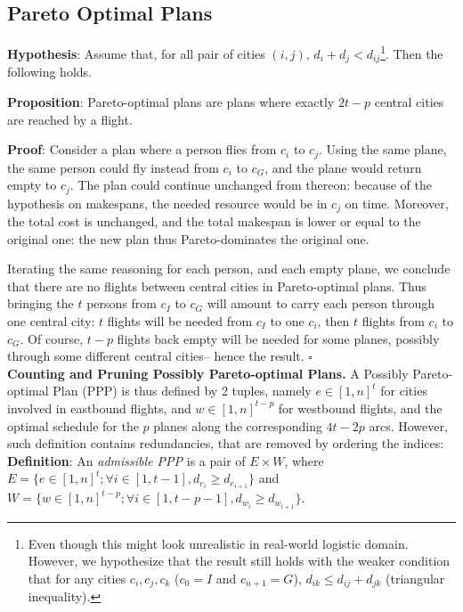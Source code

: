 \documentclass{llncs}
\begin{document}
\subsection{Pareto Optimal Plans}

\noindent
{\bf Hypothesis}: Assume that, for all pair of cities $(i,j)$, $d_i + d_j < d_{ij}$\footnote{Even though this might look unrealistic in real-world logistic domain. However, we hypothesize that the result still holds with the weaker condition that for any cities $c_i, c_j, c_k$ ($c_0=I$ and $c_{n+1}=G$), $d_{ik} \leq d_{ij} + d_{jk}$ (triangular inequality).}. Then the following holds.

\noindent
{\bf Proposition}: Pareto-optimal plans are plans where exactly $2t-p$ central cities are reached by a flight.

\noindent
{\bf Proof}:
Consider a plan where a person flies from $c_i$ to $c_j$. Using the same plane, the same person could fly instead from $c_i$ to $c_G$, and the plane would return empty to $c_j$. The plan could continue unchanged from thereon: because of the hypothesis on makespans, the needed resource would be in $c_j$ on time. Moreover, the total cost is unchanged, and the total makespan is lower or equal to the original one: the new plan thus Pareto-dominates the original one.

Iterating the same reasoning for each person, and each empty plane, we conclude that there are no flights between central cities in Pareto-optimal plans. Thus bringing the $t$ persons from $c_I$ to $c_G$ will amount to carry each person through one central city: $t$ flights will be needed from $c_I$ to one $c_i$, then $t$ flights from $c_i$ to $c_G$. Of course, $t-p$ flights back empty will be needed for some planes, possibly through some different central cities-- hence the result. \hfill $\square$\\

\noindent
{\bf Counting and Pruning Possibly Pareto-optimal Plans.}
A Possibly Pareto-optimal Plan (PPP) is thus defined by 2 tuples, namely $e \in [1,n]^t$ for cities involved in eastbound flights, and $w \in [1,n]^{t-p}$ for westbound flights, and the optimal  schedule for the $p$ planes along the corresponding $4t-2p$ arcs. However, such definition contains redundancies, that are removed by ordering the indices:\\

\noindent
{\bf Definition}: An {\it admissible PPP} is a pair of $E \times W$, where $E = \{e \in [1,n]^t ; \forall i \in [1,t-1], d_{e_i} \geq d_{e_{i+1}}\}$ and $W = \{w \in [1,n]^{t-p} ; \forall i \in [1,t-p-1],  d_{w_i} \geq d_{w_{i+1}}\}$.\\
\end{document}
